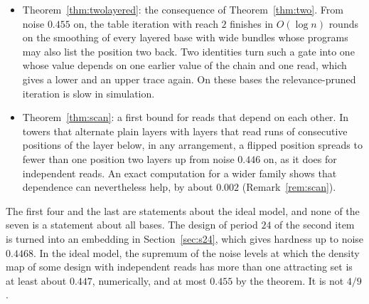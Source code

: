 \documentclass[11pt]{amsart}
\theoremstyle{definition}
\theoremstyle{remark}
\begin{document}
\begin{itemize}[leftmargin=2em]
From noise $0.455$ on, the relevance-pruned iteration finishes in $O(\log n)$ rounds on the
smoothing of every layered base with wide bundles (at least $C_1\ln n$ chains, reading random copies)
and long chains over a long preamble; the circuit embeddings of Sections~\ref{sec:latch}
and~\ref{sec:s24} can be built in this form and still prove their hardness. So embeddings of this
kind stop between $0.4468$ and $0.455$.
\item Theorem~\ref{thm:twolayered}: the consequence of Theorem~\ref{thm:two}. From noise
$0.455$ on, the table iteration with reach $2$ finishes in $O(\log n)$ rounds on the smoothing
of every layered base with wide bundles whose programs may also list the position two back.
Two identities turn such a gate into one whose value depends on one earlier value of the chain
and one read, which gives a lower and an upper trace again. On these bases the relevance-pruned
iteration is slow in simulation.
\item Theorem~\ref{thm:scan}: a first bound for reads that depend on each other. In towers
that alternate plain layers with layers that read runs of consecutive positions of the layer
below, in any arrangement, a flipped position spreads to fewer than one position two layers up
from noise $0.446$ on, as it does for independent reads. An exact computation for a wider
family shows that dependence can nevertheless help, by about $0.002$
(Remark~\ref{rem:scan}).
\end{itemize}
The first four and the last are statements about the ideal model, and none of the seven is a statement about all bases.
The design of period $24$ of the second item is turned into an embedding in
Section~\ref{sec:s24}, which gives hardness up to noise $0.4468$. In the ideal model, the supremum of the noise
levels at which the density map of some design with independent reads has more than one
attracting set is at least about $0.447$, numerically, and at most $0.455$ by the theorem. It is
not $4/9$.
\end{document}
